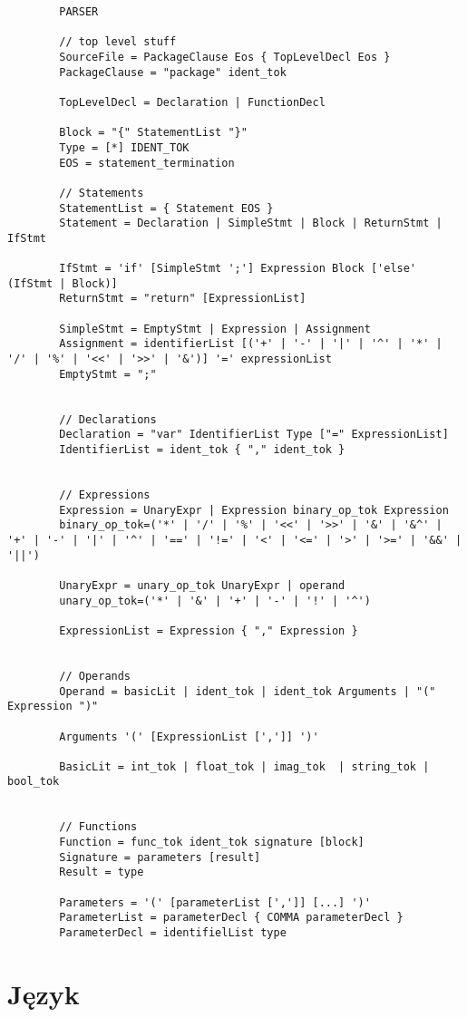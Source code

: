 \documentclass[a4paper,16pt]{article}
\begin{document}
	\begin{verbatim}
		PARSER
		
		// top level stuff
		SourceFile = PackageClause Eos { TopLevelDecl Eos }
		PackageClause = "package" ident_tok
		
		TopLevelDecl = Declaration | FunctionDecl
		
		Block = "{" StatementList "}"
		Type = [*] IDENT_TOK
		EOS = statement_termination
		
		// Statements
		StatementList = { Statement EOS }
		Statement = Declaration | SimpleStmt | Block | ReturnStmt | IfStmt
		
		IfStmt = 'if' [SimpleStmt ';'] Expression Block ['else' (IfStmt | Block)]		
		ReturnStmt = "return" [ExpressionList]
	
		SimpleStmt = EmptyStmt | Expression | Assignment
		Assignment = identifierList [('+' | '-' | '|' | '^' | '*' | '/' | '%' | '<<' | '>>' | '&')] '=' expressionList
		EmptyStmt = ";"
		
		
		// Declarations
		Declaration = "var" IdentifierList Type ["=" ExpressionList]
        IdentifierList = ident_tok { "," ident_tok }
		
		
		// Expressions
		Expression = UnaryExpr | Expression binary_op_tok Expression
		binary_op_tok=('*' | '/' | '%' | '<<' | '>>' | '&' | '&^' | '+' | '-' | '|' | '^' | '==' | '!=' | '<' | '<=' | '>' | '>=' | '&&' | '||')
		
		UnaryExpr = unary_op_tok UnaryExpr | operand
		unary_op_tok=('*' | '&' | '+' | '-' | '!' | '^')
			
		ExpressionList = Expression { "," Expression }
		
	
		// Operands
		Operand = basicLit | ident_tok | ident_tok Arguments | "(" Expression ")"
		
		Arguments '(' [ExpressionList [',']] ')'
		
		BasicLit = int_tok | float_tok | imag_tok  | string_tok | bool_tok
		
		
		// Functions
		Function = func_tok ident_tok signature [block]
		Signature = parameters [result]
		Result = type
		
		Parameters = '(' [parameterList [',']] [...] ')'
		ParameterList = parameterDecl { COMMA parameterDecl }
		ParameterDecl = identifielList type
	\end{verbatim}

    \section{Język}
    
\end{document}
